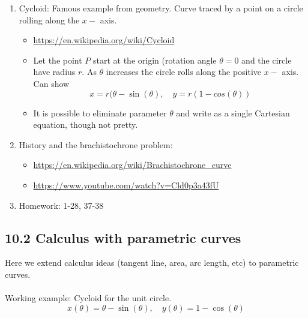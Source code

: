 \documentclass{article}
\begin{document}
\begin{enumerate}
\item Cycloid: Famous example from geometry. Curve traced by a point on a circle rolling along the $x-$ axis.
\begin{itemize}
\item \url{https://en.wikipedia.org/wiki/Cycloid}
\item Let the point $P$ start at the origin (rotation angle $\theta=0$ and the circle have radius $r$. As $\theta$ increases the circle rolls along the positive $x-$ axis. Can show
\[
x = r(\theta-\sin(\theta), \quad y=r(1-cos(\theta))
\]
\item It is possible to eliminate parameter $\theta$ and write as a single Cartesian equation, though not pretty.
\end{itemize}

\item History and the brachistochrone problem: 
\begin{itemize}
\item \url{https://en.wikipedia.org/wiki/Brachistochrone_curve}
\item \url{https://www.youtube.com/watch?v=Cld0p3a43fU}
\end{itemize}


\item Homework: 1-28, 37-38
\end{enumerate}

\subsection{10.2 Calculus with parametric curves}

Here we extend calculus ideas (tangent line, area, arc length, etc) to parametric curves. \\ \ \\

Working example: Cycloid for the unit circle.
\[
x(\theta) = \theta-\sin(\theta), \quad y(\theta) = 1-\cos(\theta)
\]
\end{document}
